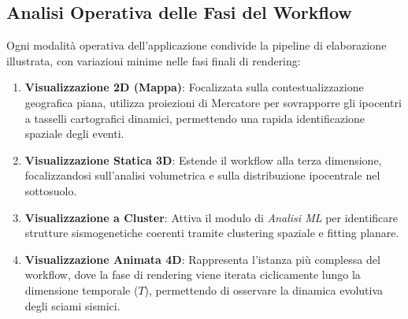\documentclass[12pt,a4paper]{article}
\begin{document}
\subsection{Analisi Operativa delle Fasi del Workflow}
Ogni modalità operativa dell'applicazione condivide la pipeline di elaborazione illustrata, con variazioni minime nelle fasi finali di rendering:
\begin{enumerate}
    \item \textbf{Visualizzazione 2D (Mappa)}: Focalizzata sulla contestualizzazione geografica piana, utilizza proiezioni di Mercatore per sovrapporre gli ipocentri a tasselli cartografici dinamici, permettendo una rapida identificazione spaziale degli eventi.
    \item \textbf{Visualizzazione Statica 3D}: Estende il workflow alla terza dimensione, focalizzandosi sull'analisi volumetrica e sulla distribuzione ipocentrale nel sottosuolo.
    \item \textbf{Visualizzazione a Cluster}: Attiva il modulo di \textit{Analisi ML} per identificare strutture sismogenetiche coerenti tramite clustering spaziale e fitting planare.
    \item \textbf{Visualizzazione Animata 4D}: Rappresenta l'istanza più complessa del workflow, dove la fase di rendering viene iterata ciclicamente lungo la dimensione temporale ($T$), permettendo di osservare la dinamica evolutiva degli sciami sismici.
\end{enumerate}
\end{document}
